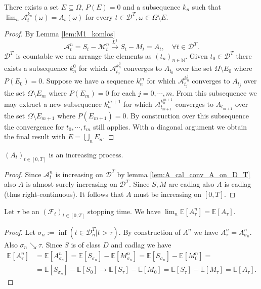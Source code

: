 \begin{lemma}\label{lem:A_cal_conv_A_on_D_T}
  There exists a set $E\subseteq\Omega$, $P(E)=0$ and a subsequence $k_n$ such that $\lim_n\mathcal{A}^{k_n}_t(\omega)=A_t(\omega)$ for every $t\in\mathcal{D}^T,\omega\in\Omega\setminus E$.
\end{lemma}
\begin{proof}
  By Lemma \ref{lem:M1_komlos}
  $$
  \mathcal{A}^n_t=S_t-\mathcal{M}^n_t\stackrel{L^1}{\rightarrow}S_t-M_t=A_t,\quad\forall t\in\mathcal{D}^T.
  $$
  $\mathcal{D}^T$ is countable we can arrange the elements as $(t_n)_{n\in\mathbb{N}}$.
  Given $t_0\in\mathcal{D}^T$ there exists a subsequence $k^{0}_n$ for which $\mathcal{A}^{k^{0}_n}_{t_0}$ converges to $A_{t_0}$ over the set $\Omega\setminus E_{0}$ where $P(E_{0})=0$.
  Suppose we have a sequence $k^m_n$ for which $\mathcal{A}^{k^j_n}_{t_j}$ converges to $A_{t_j}$ over the set $\Omega\setminus E_{m}$ where $P(E_{m})=0$ for each $j=0,\cdots,m$.
  From this subsequence we may extract a new subsequence $k^{m+1}_n$ for which $\mathcal{A}^{k^{m+1}_n}_{t_{m+1}}$ converges to $A_{t_{m+1}}$ over the set $\Omega\setminus E_{m+1}$ where $P(E_{m+1})=0$.
  By construction over this subsequence the convergence for $t_0,\cdots,t_m$ still applies.
  With a diagonal argument we obtain the final result with $E=\bigcup_n E_n$.
\end{proof}

\begin{lemma}\label{lem:A_increasing}
  $(A_t)_{t\in[0,T]}$ is an increasing process.
\end{lemma}
\begin{proof}
  Since $\mathcal{A}^n_t$ is increasing on $\mathcal{D}^T$ by lemma \ref{lem:A_cal_conv_A_on_D_T} also $A$ is almost surely increasing on $\mathcal{D}^T$.
  Since $S,M$ are cadlag also $A$ is cadlag (thus right-continuous). It follows that $A$ must be increasing on $[0,T]$.
\end{proof}

\begin{lemma}\label{lem:lim_Exp_A_n_tau_is_Exp_A_tau}
  Let $\tau$ be an $(\mathcal{F}_t)_{t\in[0,T]}$ stopping time. We have $\lim_n\mathbb{E}[A^n_\tau]=\mathbb{E}[A_\tau]$.
\end{lemma}
\begin{proof}
  Let $\sigma_n:=\inf\left(t\in\mathcal{D}^T_n\vert t>\tau\right)$. By construction of $A^n$ we have $A^n_\tau=A^n_{\sigma_n}$.
  Also $\sigma_n\searrow\tau$. Since $S$ is of class $D$ and cadlag we have
  \begin{align*}
    \mathbb{E}[A^n_\tau]&=\mathbb{E}[A^n_{\sigma_n}]=\mathbb{E}[S_{\sigma_n}]-\mathbb{E}[M^n_{\sigma_n}]=\mathbb{E}[S_{\sigma_n}]-\mathbb{E}[M^n_0]=\\
    &=\mathbb{E}[S_{\sigma_n}]-\mathbb{E}[S_0]\rightarrow \mathbb{E}[S_\tau]-\mathbb{E}[M_0]=\mathbb{E}[S_\tau]-\mathbb{E}[M_\tau]=\mathbb{E}[A_\tau].
  \end{align*}
\end{proof}

